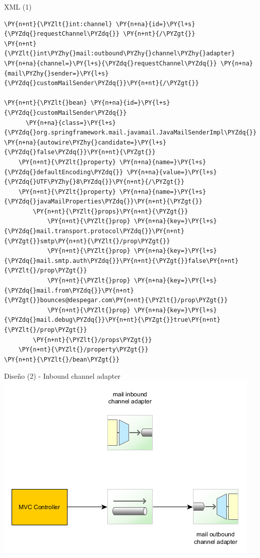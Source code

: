 \documentclass{beamer}
\begin{document}
\begin{frame}[fragile]{XML (1)}
\begin{Verbatim}[fontsize=\tiny,commandchars=\\\{\}]
\PY{n+nt}{\PYZlt{}int:channel} \PY{n+na}{id=}\PY{l+s}{\PYZdq{}requestChannel\PYZdq{}} \PY{n+nt}{/\PYZgt{}}
\PY{n+nt}{\PYZlt{}int\PYZhy{}mail:outbound\PYZhy{}channel\PYZhy{}adapter} \PY{n+na}{channel=}\PY{l+s}{\PYZdq{}requestChannel\PYZdq{}} \PY{n+na}{mail\PYZhy{}sender=}\PY{l+s}{\PYZdq{}customMailSender\PYZdq{}}\PY{n+nt}{/\PYZgt{}}

\PY{n+nt}{\PYZlt{}bean} \PY{n+na}{id=}\PY{l+s}{\PYZdq{}customMailSender\PYZdq{}} 
      \PY{n+na}{class=}\PY{l+s}{\PYZdq{}org.springframework.mail.javamail.JavaMailSenderImpl\PYZdq{}} \PY{n+na}{autowire\PYZhy{}candidate=}\PY{l+s}{\PYZdq{}false\PYZdq{}}\PY{n+nt}{\PYZgt{}}
    \PY{n+nt}{\PYZlt{}property} \PY{n+na}{name=}\PY{l+s}{\PYZdq{}defaultEncoding\PYZdq{}} \PY{n+na}{value=}\PY{l+s}{\PYZdq{}UTF\PYZhy{}8\PYZdq{}}\PY{n+nt}{/\PYZgt{}}
    \PY{n+nt}{\PYZlt{}property} \PY{n+na}{name=}\PY{l+s}{\PYZdq{}javaMailProperties\PYZdq{}}\PY{n+nt}{\PYZgt{}}
        \PY{n+nt}{\PYZlt{}props}\PY{n+nt}{\PYZgt{}}
            \PY{n+nt}{\PYZlt{}prop} \PY{n+na}{key=}\PY{l+s}{\PYZdq{}mail.transport.protocol\PYZdq{}}\PY{n+nt}{\PYZgt{}}smtp\PY{n+nt}{\PYZlt{}/prop\PYZgt{}}
            \PY{n+nt}{\PYZlt{}prop} \PY{n+na}{key=}\PY{l+s}{\PYZdq{}mail.smtp.auth\PYZdq{}}\PY{n+nt}{\PYZgt{}}false\PY{n+nt}{\PYZlt{}/prop\PYZgt{}}
            \PY{n+nt}{\PYZlt{}prop} \PY{n+na}{key=}\PY{l+s}{\PYZdq{}mail.from\PYZdq{}}\PY{n+nt}{\PYZgt{}}bounces@despegar.com\PY{n+nt}{\PYZlt{}/prop\PYZgt{}}
            \PY{n+nt}{\PYZlt{}prop} \PY{n+na}{key=}\PY{l+s}{\PYZdq{}mail.debug\PYZdq{}}\PY{n+nt}{\PYZgt{}}true\PY{n+nt}{\PYZlt{}/prop\PYZgt{}}
        \PY{n+nt}{\PYZlt{}/props\PYZgt{}}
    \PY{n+nt}{\PYZlt{}/property\PYZgt{}}
\PY{n+nt}{\PYZlt{}/bean\PYZgt{}}
\end{Verbatim}
\end{frame}

\begin{frame}{Diseño (2) - Inbound channel adapter}
\includegraphics[width=0.9\linewidth]{sp-int-02}
\end{frame}
\end{document}
